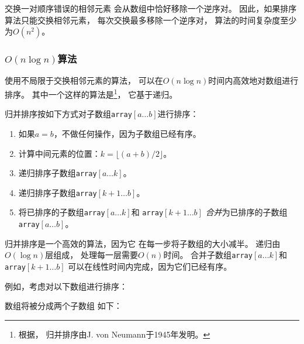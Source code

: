 交换一对顺序错误的相邻元素
会从数组中恰好移除一个逆序对。
因此，如果排序算法只能交换相邻元素，
每次交换最多移除一个逆序对，
算法的时间复杂度至少为$O(n^2)$。

\subsubsection{$O(n \log n)$算法}


使用不局限于交换相邻元素的算法，
可以在$O(n \log n)$时间内高效地对数组进行排序。
其中一个这样的算法是\footnote{根据\cite{knu983}，
归并排序由J. von Neumann于1945年发明。}，
它基于递归。

归并排序按如下方式对子数组\texttt{array}$[a \ldots b]$进行排序：

\begin{enumerate}
\item 如果$a=b$，不做任何操作，因为子数组已经有序。
\item 计算中间元素的位置：$k=\lfloor (a+b)/2 \rfloor$。
\item 递归排序子数组\texttt{array}$[a \ldots k]$。
\item 递归排序子数组\texttt{array}$[k+1 \ldots b]$。
\item 将已排序的子数组\texttt{array}$[a \ldots k]$和
\texttt{array}$[k+1 \ldots b]$
\emph{合并}为已排序的子数组\texttt{array}$[a \ldots b]$。
\end{enumerate}

归并排序是一个高效的算法，因为它
在每一步将子数组的大小减半。
递归由$O(\log n)$层组成，
处理每一层需要$O(n)$时间。
合并子数组\texttt{array}$[a \ldots k]$和\texttt{array}$[k+1 \ldots b]$
可以在线性时间内完成，因为它们已经有序。

例如，考虑对以下数组进行排序：
\begin{center}
\end{center}

数组将被分成两个子数组
如下：
\begin{center}
\end{center}

